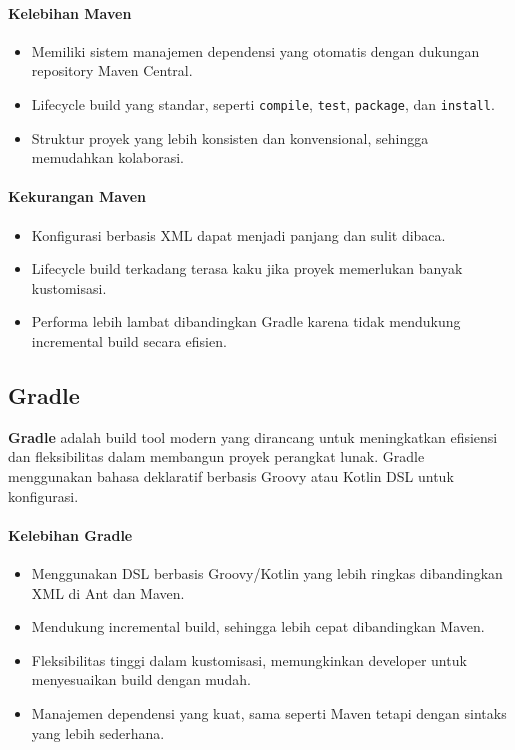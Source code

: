 \paragraph{Kelebihan Maven}
\begin{itemize}
	\item Memiliki sistem manajemen dependensi yang otomatis dengan dukungan repository Maven Central.
	\item Lifecycle build yang standar, seperti \texttt{compile}, \texttt{test}, \texttt{package}, dan \texttt{install}.
	\item Struktur proyek yang lebih konsisten dan konvensional, sehingga memudahkan kolaborasi.
\end{itemize}

\paragraph{Kekurangan Maven}
\begin{itemize}
	\item Konfigurasi berbasis XML dapat menjadi panjang dan sulit dibaca.
	\item Lifecycle build terkadang terasa kaku jika proyek memerlukan banyak kustomisasi.
	\item Performa lebih lambat dibandingkan Gradle karena tidak mendukung incremental build secara efisien.
\end{itemize}

\subsection{Gradle}
\textbf{Gradle} adalah build tool modern yang dirancang untuk meningkatkan efisiensi dan fleksibilitas dalam membangun proyek perangkat lunak. Gradle menggunakan bahasa deklaratif berbasis Groovy atau Kotlin DSL untuk konfigurasi.

\paragraph{Kelebihan Gradle}
\begin{itemize}
	\item Menggunakan DSL berbasis Groovy/Kotlin yang lebih ringkas dibandingkan XML di Ant dan Maven.
	\item Mendukung incremental build, sehingga lebih cepat dibandingkan Maven.
	\item Fleksibilitas tinggi dalam kustomisasi, memungkinkan developer untuk menyesuaikan build dengan mudah.
	\item Manajemen dependensi yang kuat, sama seperti Maven tetapi dengan sintaks yang lebih sederhana.
\end{itemize}

